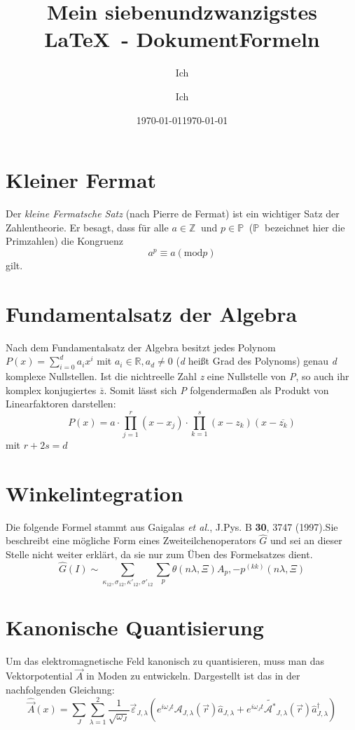 \documentclass{scrartcl}
\title{Mein siebenundzwanzigstes \LaTeX\ -  Dokument}
\author{Ich}
\date{\today}
\begin{document}
	\begin{titlepage}
		\title{Formeln}
		\author{Ich}
		\date{\today}
	\end{titlepage}
	
	\maketitle
	
	\section{Kleiner Fermat}
	Der \textit{kleine Fermatsche Satz} (nach Pierre de Fermat) ist ein wichtiger Satz der Zahlentheorie. Er besagt, dass für alle $a \in \mathbb{Z}\ $ und $ p \in \mathbb{P}\ $ ($\mathbb{P}\ $ bezeichnet hier die Primzahlen) die Kongruenz \[ a^p \equiv a (\mathrm{mod }p)
	\] gilt.
	
	\section{Fundamentalsatz der Algebra}
	Nach dem Fundamentalsatz der Algebra besitzt jedes Polynom $ P(x)= \sum_{i=0}^d a_ix^i$ mit $a_i \in \mathbb{R}, a_d \neq 0$ (\textit{d} heißt Grad des Polynoms) genau \textit{d} komplexe Nullstellen. Ist die nichtreelle Zahl \textit{z} eine Nullstelle von \textit{P}, so auch ihr komplex konjugiertes $\overline{z}$. Somit lässt sich \textit{P} folgendermaßen als Produkt von Linearfaktoren darstellen: 
	\[ 
	P(x)=a \cdot \prod_{j=1}^{r}(x-x_j) \cdot \prod_{k=1}^{s} (x-z_k)(x-\overline{z_k})
	\]
	mit $r+2s=d$
	
	\section{Winkelintegration}
	Die folgende Formel stammt aus Gaigalas \textit{et al.}, J.Pys. B \textbf{30}, 3747 (1997).Sie beschreibt eine mögliche Form eines Zweiteilchenoperators $\hat{G}$ und sei an dieser Stelle nicht weiter erklärt, da sie nur zum Üben des Formelsatzes dient.
	\[
	\hat{G}(I) \sim \sum_{\kappa_{12}, \sigma_{12}, \kappa'_{12}, \sigma'_{12}}
	\sum_p\theta(n\lambda, \Xi)A_p,-p^{(kk)}(n\lambda, \Xi)
	\]
	
	\section{Kanonische Quantisierung}
	Um das elektromagnetische Feld kanonisch zu quantisieren, muss man das Vektorpotential $\vec{A}$ in Moden zu entwickeln. Dargestellt ist das in der nachfolgenden Gleichung:
	\begin{equation}
	\hat{\vec{A}}(x) = \sum_J\sum_{\lambda=1}^2 \frac{1}{\sqrt{\omega_J}}\vec{\varepsilon}_{J,\lambda}\left(e^{i\omega_Jt}\mathcal{A}_{J,\lambda}(\vec{r})\hat{a}_{J,\lambda}+e^{i\omega_Jt}\tilde{\mathcal{A^*}}_{J,\lambda}(\vec{r})
	\hat{a}^{\dagger}_{J,\lambda}
	\right)
	\end{equation}
	
\end{document}
